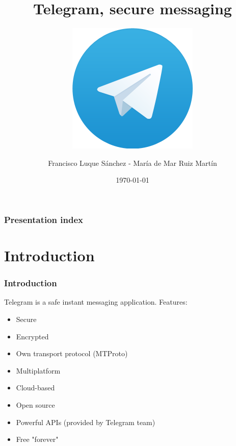 \documentclass{beamer}
\title[Telegram, secure messaging]{Telegram, secure messaging} %
\subtitle{\includegraphics[scale=0.15]{images/t_logo}}
\author{Francisco Luque Sánchez - María de Mar Ruiz Martín} %
\institute[UGR] %
{
  Universidad de Granada \\ %
  \medskip
  \textit{fluque1995@correo.ugr.es - mariadel52@correo.ugr.es} %
}
\date{\today} %
\begin{document}
\begin{frame}
\titlepage %
\end{frame}

\begin{frame}
  \frametitle{Presentation index} %
  \tableofcontents
\end{frame}




\section{Introduction} %

\begin{frame}
\frametitle{Introduction}
Telegram is a safe instant messaging application. Features:
\begin{itemize}
\item Secure
\item Encrypted
\item Own transport protocol (MTProto)
\item Multiplatform
\item Cloud-based
\item Open source
\item Powerful APIs (provided by Telegram team)
\item Free "forever"
\end{itemize}
\end{frame}
\end{document}
